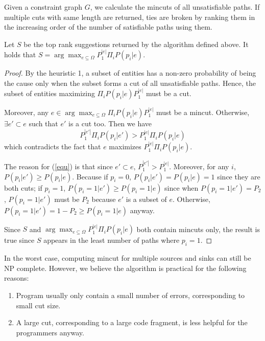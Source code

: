 Given a constraint graph $G$, we calculate the mincuts of all unsatisfiable
paths. If multiple cuts with same length are returned, ties are broken by
ranking them in the increasing order of the number of satisfiable paths using
them.

\begin{Theorem}
Let $S$ be the top rank suggestions returned by the algorithm defined above.
It holds that $S = \arg\max_{e\subseteq \Omega}P_1^{|e|} \Pi_i P(p_i|e)$.  
\end{Theorem}

\begin{proof}
By the heuristic 1, a subset of entities has a non-zero probability of being
the cause only when the subset forms a cut of all unsatisfiable paths. Hence,
the subset of entities maximizing $\Pi_i P(p_i|e) P_1^{|e|}$ must be a cut.

Moreover, any $e\in \arg\max_{e\subseteq \Omega}\Pi_i P(p_i|e) P_1^{|e|}$ must
be a mincut. Otherwise, $\exists e'\subset e$ such that $e'$ is a cut too. Then
we have
\begin{equation}
\label{equ}
P_1^{|e'|} \Pi_i P(p_i|e') > P_1^{|e|} \Pi_i P(p_i|e)
\end{equation}
which contradicts the fact that $e$ maximizes $P_1^{|e|} \Pi_i P(p_i|e)$.

The reason for (\ref{equ}) is that since $e'\subset e$, $P_1^{|e'|}>
P_1^{|e|}$. Moreover, for any $i$,  $P(p_i|e') \geq P(p_i|e)$. Because if
$p_i=0$, $P(p_i|e')=P(p_i|e)=1$ since they are both cuts; if $p_i=1$,
$P(p_i=1|e')\geq P(p_i=1|e)$ since when $P(p_i=1|e')=P_2$,
$P(p_i=1|e')$ must be $P_2$ because $e'$ is a subset of $e$.
Otherwise, $P(p_i=1|e')=1-P_2\geq P(p_i=1|e)$ anyway.

Since $S$ and $\arg\max_{e\subseteq \Omega}P_1^{|e|} \Pi_i P(p_i|e)$ both
contain mincuts only, the result is true since $S$ appears in the least
number of paths where $p_i=1$.
\end{proof}

In the worst case, computing mincut for multiple sources and sinks can
still be NP complete. However, we believe the algorithm is practical
for the following reasons:
\begin{enumerate}
\item Program usually only contain a small number of errors, corresponding to
small cut size.

\item A large cut, corresponding to a large code fragment, is
less helpful for the programmers anyway.
\end{enumerate}

